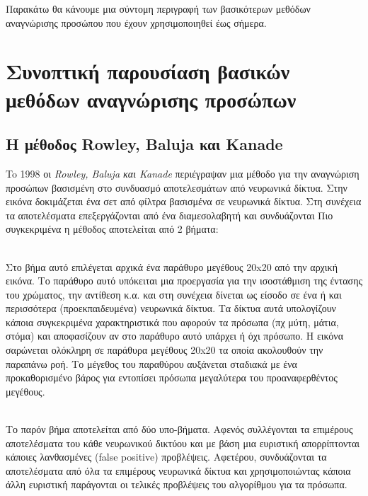 Παρακάτω θα κάνουμε μια σύντομη περιγραφή των βασικότερων μεθόδων αναγνώρισης
προσώπου που έχουν χρησιμοποιηθεί έως σήμερα.

\section{Συνοπτική παρουσίαση βασικών μεθόδων αναγνώρισης προσώπων}\label{sec:facedetmethods}



\subsection{Η μέθοδος Rowley, Baluja και Kanade~\cite{Rowley:1998:NNF:275341.275344}}

To 1998 οι \emph{Rowley, Baluja και Kanade} περιέγραψαν μια μέθοδο για την αναγνώριση
προσώπων βασισμένη στο συνδυασμό αποτελεσμάτων από νευρωνικά δίκτυα. Στην εικόνα
δοκιμάζεται ένα σετ από φίλτρα βασισμένα σε νευρωνικά δίκτυα. Στη συνέχεια τα
αποτελέσματα επεξεργάζονται από ένα διαμεσολαβητή και συνδυάζονται Πιο συγκεκριμένα
η μέθοδος αποτελείται από 2 βήματα:

\begin{description}\label{item:rowley}
  \item[Βήμα 1] \hfill \\
    Στο βήμα αυτό επιλέγεται αρχικά ένα παράθυρο μεγέθους 20x20 από την αρχική εικόνα.
    Το παράθυρο αυτό υπόκειται μια προεργασία για την ισοστάθμιση της έντασης του
    χρώματος, την αντίθεση κ.α. και στη συνέχεια δίνεται ως είσοδο σε ένα ή και
    περισσότερα (προεκπαιδευμένα) νευρωνικά δίκτυα. Τα δίκτυα αυτά υπολογίζουν κάποια
    συγκεκριμένα χαρακτηριστικά που αφορούν τα πρόσωπα (πχ μύτη, μάτια, στόμα) και
    αποφασίζουν αν στο παράθυρο αυτό υπάρχει ή όχι πρόσωπο. Η εικόνα σαρώνεται
    ολόκληρη σε παράθυρα μεγέθους 20x20 τα οποία ακολουθούν την παραπάνω ροή.
    Το μέγεθος του παραθύρου αυξάνεται σταδιακά με ένα προκαθορισμένο βάρος για
    εντοπίσει πρόσωπα μεγαλύτερα του προαναφερθέντος μεγέθους.
  \item[Βήμα 2] \hfill \\
    Το παρόν βήμα αποτελείται από δύο υπο-βήματα. Αφενός συλλέγονται τα επιμέρους
    αποτελέσματα του κάθε νευρωνικού δικτύου και με βάση μια ευριστική απορρίπτονται
    κάποιες λανθασμένες (false positive) προβλέψεις. Αφετέρου, συνδυάζονται τα
    αποτελέσματα από όλα τα επιμέρους νευρωνικά δίκτυα και χρησιμοποιώντας κάποια
    άλλη ευριστική παράγονται οι τελικές προβλέψεις του αλγορίθμου για τα πρόσωπα.
\end{description}

